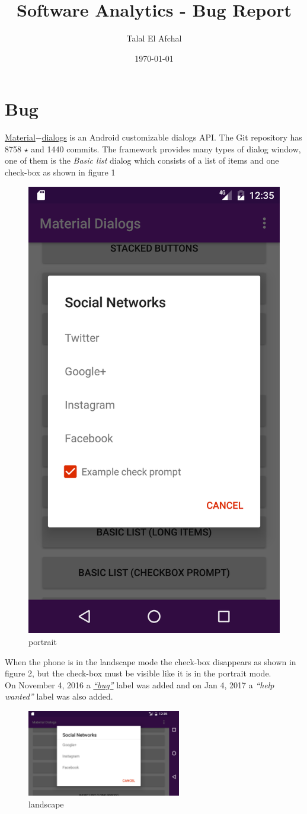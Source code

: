 \documentclass[12pt]{report}
\begin{document}
\title{Software Analytics - Bug Report}
\author{Talal El Afchal}
\date{\today}
\maketitle
	\section*{Bug}
\href{https://github.com/afollestad/material-dialogs}{Material$-$dialogs} is an Android customizable dialogs API. The Git repository has 8758 $\star$ and 1440 commits.
The framework provides many types of dialog window, one of them is the \emph{Basic list} dialog which consists of a list of items and one check-box as shown in figure 1

\begin{figure}[H]
	\centering
	\includegraphics[height=0.4\textwidth]{screenshots/portrait.png}
	\caption{portrait}
\end{figure}
\noindent When the phone is in the landscape mode the check-box disappears as shown in figure 2, but the check-box must be visible like it is in the portrait mode.\\ On November 4, 2016 a \href{https://github.com/afollestad/material-dialogs/issues/1162}{\emph{``bug''}} label was added and on Jan 4, 2017 a \emph{``help wanted''} label was also added.\\


\begin{figure}[H]
	\centering
	\includegraphics[width=0.6\textwidth]{screenshots/landscape.png}
	\caption{landscape}
\end{figure}
\end{document}
